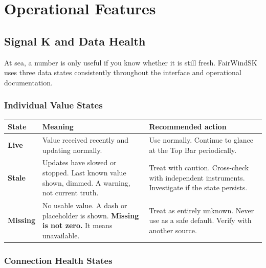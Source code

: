 \part{Operational Features}

\chapter{Signal K and Data Health}
\label{ch:datahealth}

At sea, a number is only useful if you know whether it is still fresh.
FairWindSK uses three data states consistently throughout the interface
and operational documentation.

\section{Individual Value States}

\begin{longtable}{L{2.2cm}L{5.4cm}L{6.1cm}}
\toprule
{}
\color{white}\sffamily\bfseries State &
\color{white}\sffamily\bfseries Meaning &
\color{white}\sffamily\bfseries Recommended action \\
\midrule
\textbf{Live}    &
  Value received recently and updating normally. &
  Use normally. Continue to glance at the Top Bar periodically. \\
\textbf{Stale}   &
  Updates have slowed or stopped. Last known value shown, dimmed.
  A warning, not current truth. &
  Treat with caution. Cross-check with independent instruments.
  Investigate if the state persists. \\
\textbf{Missing} &
  No usable value. A dash or placeholder is shown.
  \textbf{Missing is not zero.} It means unavailable. &
  Treat as entirely unknown. Never use as a safe default.
  Verify with another source. \\
\bottomrule
\end{longtable}

\section{Connection Health States}

